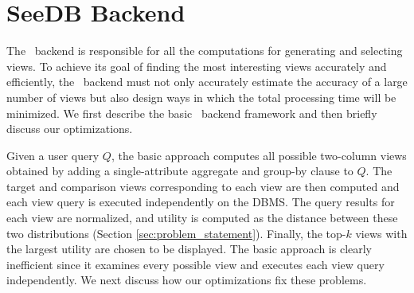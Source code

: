 \section{SeeDB Backend}
\label{subsec:seedb_backend}

The \SeeDB\ backend is responsible for all the computations for 
generating and selecting views. 
To achieve its goal of finding the most
interesting views accurately and efficiently, the \SeeDB\ backend must not only accurately
estimate the accuracy of a large number of views but also design ways in which
the total processing time will be minimized.
We first describe the basic \SeeDB\ backend framework and then briefly discuss our optimizations.


Given a user query $Q$, the basic approach computes all
possible two-column views obtained by adding a single-attribute aggregate and group-by clause to $Q$. 
The target and comparison views corresponding to each view are then
computed and each view query is executed independently on the DBMS. The query
results for each view are normalized, and utility is computed as the
distance between these two distributions (Section \ref{sec:problem_statement}).
Finally, the top-$k$ views with the largest utility are chosen to be displayed. 
The basic approach is clearly inefficient
since it examines every possible view 
and executes each view query independently.
We next discuss how our optimizations fix these problems.

